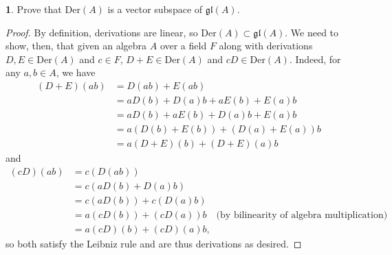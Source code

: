\documentclass[12pt]{article}
\newcommand{\gl}{\mathfrak{gl}}
\theoremstyle{definition}
\newtheorem{ex}{}
\begin{document}
\begin{ex}
	Prove that $\mathrm{Der}(A)$ is a vector subspace of $\gl(A)$.
\end{ex}
\begin{proof}
	By definition, derivations are linear, so $\mathrm{Der}(A) \subset \gl(A)$.
	We need to show, then, that given an algebra $A$ over a field $F$ along with derivations $D, E \in \mathrm{Der}(A)$ and $c \in F$, $D + E \in \mathrm{Der}(A)$ and $cD \in \mathrm{Der}(A)$.
	Indeed, for any $a, b \in A$, we have \begin{align*}
		(D + E)(ab) & = D(ab) + E(ab)                   \\
		            & = aD(b) + D(a)b + aE(b) + E(a)b   \\
		            & = aD(b) + aE(b) + D(a)b + E(a)b   \\
		            & = a(D(b) + E(b)) + (D(a) + E(a))b \\
		            & = a(D + E)(b) + (D + E)(a)b
	\end{align*}
	and \begin{align*}
		(cD)(ab) & = c(D(ab))                                                                           \\
		         & = c(aD(b) + D(a)b)                                                                   \\
		         & = c(aD(b)) + c(D(a)b)                                                                \\
		         & = a(cD(b)) + (cD(a))b \hspace{1em} \text{(by bilinearity of algebra multiplication)} \\
		         & = a(cD)(b) + (cD)(a)b,
	\end{align*}
	so both satisfy the Leibniz rule and are thus derivations as desired.
\end{proof}
\end{document}

